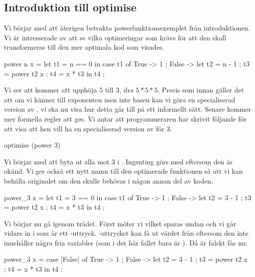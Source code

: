 \documentclass[../Optimise]{subfiles}
\begin{document}
\subsection{Introduktion till optimise}

Vi börjar med att återigen betrakta powerfunktionsexemplet från introduktionen. Vi är
intresserade av att se vilka optimeringar som krävs för att den skall transformeras till den
mer optimala kod som visades.
\begin{codeEx}
power n x = let t1 = n == 0
    in case t1 of
        { True -> 1
        ; False -> let 
            { t2 = n - 1 
            ; t3 = power t2 x
            ; t4 = x * t3
            } in t4
        };
\end{codeEx}
Vi ser att  kommer att upphöja $5$ till $3$, dvs $5 * 5 * 5$.
Precis som innan gäller det att om vi känner till exponenten men inte basen kan vi göra en specialiserad version av , vi ska nu visa hur detta går till på ett informellt sätt. 
Senare kommer mer formella regler att ges. Vi antar att programmeraren
har skrivit följande för att visa att hen vill ha en specialiserad version av  för $3$.

\begin{codeEx}
optimise (power 3)
\end{codeEx}

Vi börjar med att byta ut alla  mot $3$ i . Ingenting görs med 
 eftersom den är okänd. Vi ger också ett nytt namn till den optimerade funktionen
så att vi kan behålla originalet om den skulle behövas i någon annan del av koden.
\begin{codeEx}
power_3 x = let t1 = 3 == 0
    in case t1 of
        { True -> 1
        ; False -> let 
            { t2 = 3 - 1 
            ; t3 = power t2 x
            ; t4 = x * t3
            } in t4
        };
\end{codeEx}

Vi börjar nu gå igenom trädet. Först möter vi  vilket 
sparas undan och vi går vidare in i  som är ett -uttryck. 
-uttrycket kan få ut värdet från  eftersom den inte innehåller några 
fria variabler (som i det här fallet bara är ). Då  är falskt fås nu: 

\begin{codeExDiff}
power_3 x = case |False| of
    { True -> 1
    ; False -> let 
        { t2 = 3 - 1 
        ; t3 = power t2 x
        ; t4 = x * t3
        } in t4
    };
\end{codeExDiff}
\end{document}
